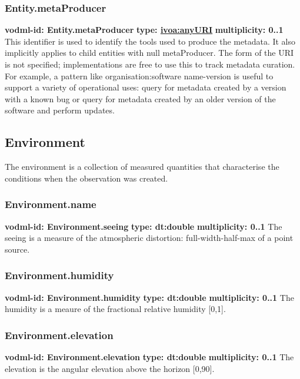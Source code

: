     \subsubsection{Entity.metaProducer}
      \textbf{vodml-id: Entity.metaProducer} \newline
      \textbf{type: \hyperref[sect:ivoa]{ivoa:anyURI}} \newline
      \textbf{multiplicity: 0..1} \newline
      This identifier is used to identify the tools used to produce the metadata. It also implicitly applies to child entities with null metaProducer. The form of the URI is not specified; implementations are free to use this to track metadata curation. For example, a pattern like {organisation}:{software name}-{version} is useful to support a variety of operational uses: query for metadata created by a version with a known bug or query for metadata created by an older version of the software and perform updates.

  \subsection{Environment}
  \label{sect:Environment}
    The environment is a collection of measured quantities that characterise the conditions when the observation was created.

    \subsubsection{Environment.name}
      \textbf{vodml-id: Environment.seeing} \newline
      \textbf{type: dt:double} \newline
      \textbf{multiplicity: 0..1} \newline
      The seeing is a measure of the atmospheric distortion: full-width-half-max of a point source.

    \subsubsection{Environment.humidity}
      \textbf{vodml-id: Environment.humidity} \newline
      \textbf{type: dt:double} \newline
      \textbf{multiplicity: 0..1} \newline
      The humidity is a meaure of the fractional relative humidity [0,1].

    \subsubsection{Environment.elevation}
      \textbf{vodml-id: Environment.elevation} \newline
      \textbf{type: dt:double} \newline
      \textbf{multiplicity: 0..1} \newline
      The elevation is the angular elevation above the horizon [0,90].

